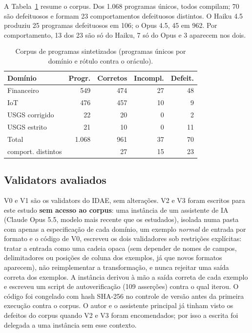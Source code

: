 \documentclass[sigconf,nonacm]{acmart}
\begin{document}
A Tabela~\ref{tab:corpus} resume o corpus. Dos 1.068 programas únicos, todos compilam; 70 são defeituosos e formam 23 comportamentos defeituosos distintos. O Haiku 4.5 produziu 25 programas defeituosos em 106; o Opus 4.5, 45 em 962. Por comportamento, 13 dos 23 são só do Haiku, 7 só do Opus e 3 aparecem nos dois.

\begin{table}[t]
\caption{Corpus de programas sintetizados (programas únicos por domínio e rótulo contra o oráculo).}
\label{tab:corpus}
\small
\begin{tabular}{lrrrr}
\toprule
Domínio & Progr. & Corretos & Incompl. & Defeit. \\
\midrule
Financeiro & 549 & 474 & 27 & 48 \\
IoT & 476 & 457 & 10 & 9 \\
USGS corrigido & 22 & 20 & 0 & 2 \\
USGS estrito & 21 & 10 & 0 & 11 \\
\midrule
Total & 1.068 & 961 & 37 & 70 \\
\quad comport. distintos & & 27 & 15 & 23 \\
\bottomrule
\end{tabular}
\end{table}

\subsection{Validators avaliados}

V0 e V1 são os validators do IDAE, sem alterações. V2 e V3 foram escritos para este estudo \textbf{sem acesso ao corpus}: uma instância de um assistente de IA (Claude Opus 5.5, modelo mais recente que os estudados), isolada numa pasta com apenas a especificação de cada domínio, um exemplo \textit{normal} de entrada por formato e o código de V0, escreveu os dois validadores sob restrições explícitas: tratar a entrada como uma cadeia opaca (sem depender de nomes de campos, delimitadores ou posições de coluna dos exemplos, já que novos formatos aparecem), não reimplementar a transformação, e nunca rejeitar uma saída correta dos exemplos. A instância derivou à mão a saída correta de cada exemplo e escreveu um script de autoverificação (109 asserções) contra o qual iterou. O código foi congelado com hash SHA-256 no controle de versão antes da primeira execução contra o corpus. O autor e o assistente principal já tinham visto os defeitos do corpus quando V2 e V3 foram encomendados; por isso a escrita foi delegada a uma instância sem esse contexto.
\end{document}

